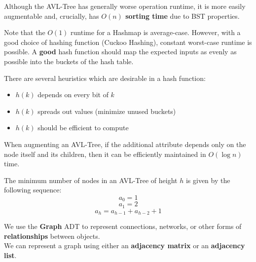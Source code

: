 \documentclass{article}
\begin{document}
\begin{crll}
Although the AVL-Tree has generally worse operation runtime, it is more easily augmentable and, crucially, has \textbf{$ O(n) $ sorting time} due to BST properties.
\end{crll}

\begin{crll}
Note that the $ O(1) $ runtime for a Hashmap is average-case. However, with a good choice of hashing function (Cuckoo Hashing), constant worst-case runtime is possible. \vsp
A \textbf{good} hash function should map the expected inputs as evenly as possible into the buckets of the hash table.
\end{crll}

\begin{crll}
There are several heuristics which are desirable in a hash function:
\begin{itemize}
    \item $ h(k) $ depends on every bit of $ k $
    \item $ h(k) $ spreads out values (minimize unused buckets)
    \item $ h(k) $ should be efficient to compute
\end{itemize}
\end{crll}

\begin{lm}
When augmenting an AVL-Tree, if the additional attribute depends only on the node itself and its children, then it can be efficiently maintained in $ O(\log n) $ time.
\end{lm}

\begin{crll}
The minimum number of nodes in an AVL-Tree of height $ h $ is given by the following sequence:
\begin{equation*}
a_{0} = 1
\end{equation*}
\begin{equation*}
a_{1} = 2
\end{equation*}
\begin{equation*}
a_{h} = a_{h-1} + a_{h-2} + 1
\end{equation*}
\end{crll}

\begin{defn}
We use the \textbf{Graph} ADT to represent connections, networks, or other forms of \textbf{relationships} between objects. \\
We can represent a graph using either an \textbf{adjacency matrix} or an \textbf{adjacency list}.
\end{defn}
\end{document}
